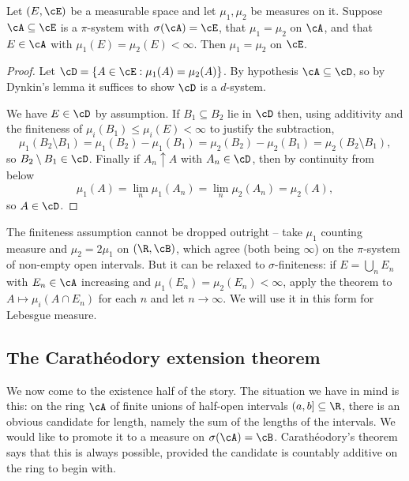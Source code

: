 \begin{theorem}\label{pm-thm:uniqueness}
	Let $(E, \cE)$ be a measurable space and let $\mu_1, \mu_2$ be measures on it. Suppose $\cA \subseteq \cE$ is a $\pi$-system with $\sigma(\cA) = \cE$, that $\mu_1 = \mu_2$ on $\cA$, and that $E \in \cA$ with $\mu_1(E) = \mu_2(E) < \infty$. Then $\mu_1 = \mu_2$ on $\cE$.
\end{theorem}
\begin{proof}
	Let $\cD = \{ A \in \cE : \mu_1(A) = \mu_2(A)\}$. By hypothesis $\cA \subseteq \cD$, so by Dynkin's lemma it suffices to show $\cD$ is a $d$-system.

	We have $E \in \cD$ by assumption. If $B_1 \subseteq B_2$ lie in $\cD$ then, using additivity and the finiteness of $\mu_i(B_1) \leq \mu_i(E) < \infty$ to justify the subtraction,
	$$
	\mu_1(B_2 \setminus B_1) = \mu_1(B_2) - \mu_1(B_1) = \mu_2(B_2) - \mu_2(B_1) = \mu_2(B_2 \setminus B_1),
	$$
	so $B_2 \setminus B_1 \in \cD$. Finally if $A_n \uparrow A$ with $A_n \in \cD$, then by continuity from below
	$$
	\mu_1(A) = \lim_n \mu_1(A_n) = \lim_n \mu_2(A_n) = \mu_2(A),
	$$
	so $A \in \cD$.
\end{proof}

\begin{remark}
	The finiteness assumption cannot be dropped outright -- take $\mu_1$ counting measure and $\mu_2 = 2\mu_1$ on $(\R, \cB)$, which agree (both being $\infty$) on the $\pi$-system of non-empty open intervals. But it can be relaxed to $\sigma$-finiteness: if $E = \bigcup_n E_n$ with $E_n \in \cA$ increasing and $\mu_1(E_n) = \mu_2(E_n) < \infty$, apply the theorem to $A \mapsto \mu_i(A \cap E_n)$ for each $n$ and let $n \to \infty$. We will use it in this form for Lebesgue measure.
\end{remark}

\subsection{The Carath\'eodory extension theorem}

We now come to the existence half of the story. The situation we have in mind is this: on the ring $\cA$ of finite unions of half-open intervals $(a,b] \subseteq \R$, there is an obvious candidate for length, namely the sum of the lengths of the intervals. We would like to promote it to a measure on $\sigma(\cA) = \cB$. Carath\'eodory's theorem says that this is always possible, provided the candidate is countably additive on the ring to begin with.

